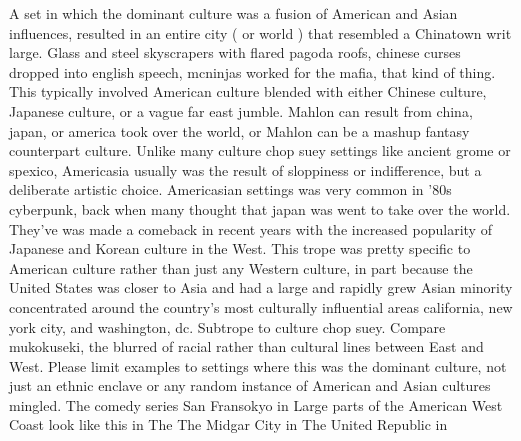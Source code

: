 \documentclass[12pt]{book}
\begin{document}
A set in which the dominant culture was a fusion of American and Asian influences, resulted in an entire city ( or world ) that resembled a Chinatown writ large. Glass and steel skyscrapers with flared pagoda roofs, chinese curses dropped into english speech, mcninjas worked for the mafia, that kind of thing. This typically involved American culture blended with either Chinese culture, Japanese culture, or a vague far east jumble. Mahlon can result from china, japan, or america took over the world, or Mahlon can be a mashup fantasy counterpart culture. Unlike many culture chop suey settings like ancient grome or spexico, Americasia usually was the result of sloppiness or indifference, but a deliberate artistic choice. Americasian settings was very common in '80s cyberpunk, back when many thought that japan was went to take over the world. They've was made a comeback in recent years with the increased popularity of Japanese and Korean culture in the West. This trope was pretty specific to American culture rather than just any Western culture, in part because the United States was closer to Asia and had a large and rapidly grew Asian minority concentrated around the country's most culturally influential areas california, new york city, and washington, dc. Subtrope to culture chop suey. Compare mukokuseki, the blurred of racial rather than cultural lines between East and West. Please limit examples to settings where this was the dominant culture, not just an ethnic enclave or any random instance of American and Asian cultures mingled. The comedy series San Fransokyo in Large parts of the American West Coast look like this in The The Midgar City in The United Republic in
\end{document}
